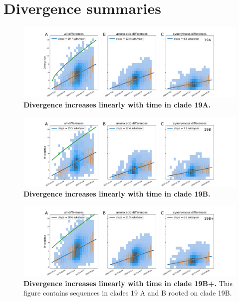\section*{Divergence summaries}

\begin{figure}[h]
    \includegraphics[width=\textwidth]{figures/rtt/19A_rtt.pdf}
    \caption{{\bf Divergence increases linearly with time in clade 19A.}
    \label{fig:19A_divergence}}
\end{figure}

\begin{figure}[h]
    \includegraphics[width=\textwidth]{figures/rtt/19B_rtt.pdf}
    \caption{{\bf Divergence increases linearly with time in clade 19B.}
    \label{fig:19B_divergence}}
\end{figure}

\begin{figure}[h]
    \includegraphics[width=\textwidth]{figures/rtt/19B+_rtt.pdf}
    \caption{{\bf Divergence increases linearly with time in clade 19B+.}
    This figure contains sequences in clades 19 A and B rooted on clade 19B.
    \label{fig:19B+_divergence}}
\end{figure}

